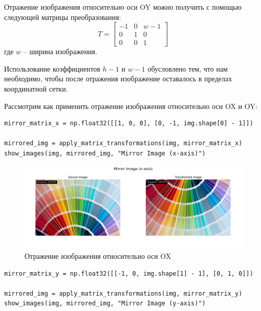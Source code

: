 Отражение изображения относительно оси OY можно получить с помощью следующей матрицы преобразования:
\begin{equation}
T = \begin{bmatrix}
    -1 & 0 & w - 1 \\
    0 & 1 & 0 \\
    0 & 0 & 1
\end{bmatrix}  
\end{equation}
где $w$ -- ширина изображения.

Использование коэффициентов $h - 1$ и $w - 1$ обусловлено тем, что нам необходимо, чтобы после отражения изображение оставалось в пределах координатной сетки.

Рассмотрим как применить отражение изображения относительно оси OX и OY:

\begin{lstlisting}[style=python_white, caption={Исходный код для отражения изображения относительно оси OX}]
mirror_matrix_x = np.float32([[1, 0, 0], [0, -1, img.shape[0] - 1]])

mirrored_img = apply_matrix_transformations(img, mirror_matrix_x)
show_images(img, mirrored_img, "Mirror Image (x-axis)")
\end{lstlisting}

\begin{figure}[ht]
    \includegraphics[width=\textwidth]{../results/Mirror Image (x-axis).png}
    \caption{Отражение изображения относительно оси OX}
    \label{fig:mirror_image_x}
\end{figure}

\pagebreak
\begin{lstlisting}[style=python_white, caption={Исходный код для отражения изображения относительно оси OY}]
mirror_matrix_y = np.float32([[-1, 0, img.shape[1] - 1], [0, 1, 0]])

mirrored_img = apply_matrix_transformations(img, mirror_matrix_y)
show_images(img, mirrored_img, "Mirror Image (y-axis)")
\end{lstlisting}

